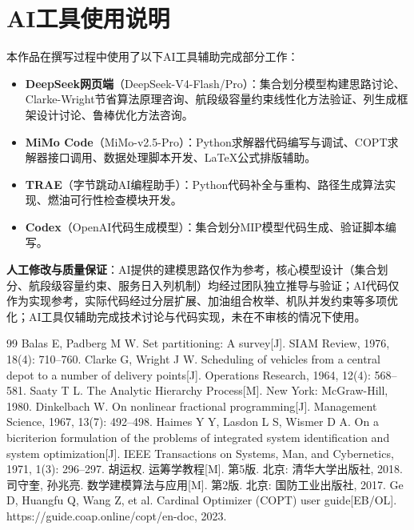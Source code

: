 \documentclass[withoutpreface]{cumcmthesis}
\begin{document}
\section{AI工具使用说明}

本作品在撰写过程中使用了以下AI工具辅助完成部分工作：

\begin{itemize}
    \item \textbf{DeepSeek网页端}（DeepSeek-V4-Flash/Pro）：集合划分模型构建思路讨论、Clarke-Wright节省算法原理咨询、航段级容量约束线性化方法验证、列生成框架设计讨论、鲁棒优化方法咨询。
    \item \textbf{MiMo Code}（MiMo-v2.5-Pro）：Python求解器代码编写与调试、COPT求解器接口调用、数据处理脚本开发、LaTeX公式排版辅助。
    \item \textbf{TRAE}（字节跳动AI编程助手）：Python代码补全与重构、路径生成算法实现、燃油可行性检查模块开发。
    \item \textbf{Codex}（OpenAI代码生成模型）：集合划分MIP模型代码生成、验证脚本编写。
\end{itemize}

\textbf{人工修改与质量保证}：AI提供的建模思路仅作为参考，核心模型设计（集合划分、航段级容量约束、服务日入列机制）均经过团队独立推导与验证；AI代码仅作为实现参考，实际代码经过分层扩展、加油组合枚举、机队并发约束等多项优化；AI工具仅辅助完成技术讨论与代码实现，未在不审核的情况下使用。

\begin{thebibliography}{99}
 Balas E, Padberg M W. Set partitioning: A survey[J]. SIAM Review, 1976, 18(4): 710--760.
 Clarke G, Wright J W. Scheduling of vehicles from a central depot to a number of delivery points[J]. Operations Research, 1964, 12(4): 568--581.
 Saaty T L. The Analytic Hierarchy Process[M]. New York: McGraw-Hill, 1980.
 Dinkelbach W. On nonlinear fractional programming[J]. Management Science, 1967, 13(7): 492--498.
 Haimes Y Y, Lasdon L S, Wismer D A. On a bicriterion formulation of the problems of integrated system identification and system optimization[J]. IEEE Transactions on Systems, Man, and Cybernetics, 1971, 1(3): 296--297.
 胡运权. 运筹学教程[M]. 第5版. 北京: 清华大学出版社, 2018.
 司守奎, 孙兆亮. 数学建模算法与应用[M]. 第2版. 北京: 国防工业出版社, 2017.
 Ge D, Huangfu Q, Wang Z, et al. Cardinal Optimizer (COPT) user guide[EB/OL]. https://guide.coap.online/copt/en-doc, 2023.
\end{thebibliography}
\end{document}
